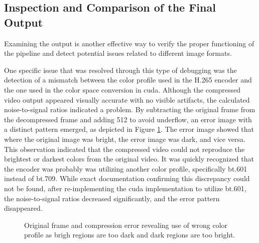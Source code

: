 \subsection{Inspection and Comparison of the Final Output}
\label{sec:inspection_and_comparison_of_the_final_output}
Examining the output is another effective way to verify the proper functioning of the pipeline and detect potential issues related to different image formats.

One specific issue that was resolved through this type of debugging was the detection of a mismatch between the color profile used in the H.265 encoder and the one used in the color space conversion in \gls{cuda}.
Although the compressed video output appeared visually accurate with no visible artifacts, the calculated noise-to-signal ratios indicated a problem.
By subtracting the original frame from the decompressed frame and adding 512 to avoid underflow, an error image with a distinct pattern emerged, as depicted in Figure \ref{fig:compression_error}.
The error image showed that where the original image was bright, the error image was dark, and vice versa.
This observation indicated that the compressed video could not reproduce the brightest or darkest colors from the original video.
It was quickly recognized that the encoder was probably was utilizing another color profile, specifically bt.601 instead of bt.709.
While exact documentation confirming this discrepancy could not be found, after re-implementing the \gls{cuda} implementation to utilize bt.601, the noise-to-signal ratios decreased significantly, and the error pattern disappeared.

\begin{figure}
    \centering
    \caption{Original frame and compression error revealing use of wrong color profile as brigh regions are too dark and dark regions are too bright.}
    \label{fig:compression_error}
\end{figure}